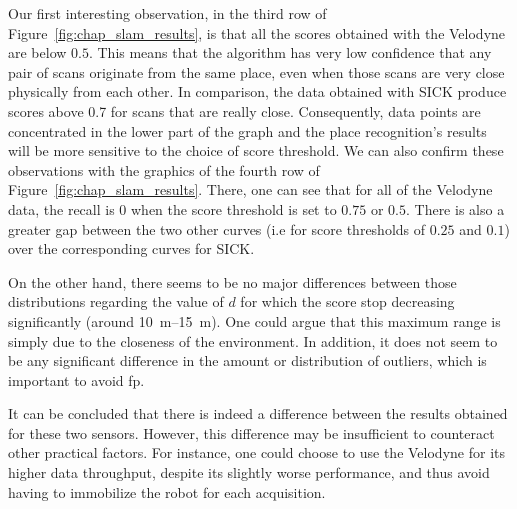 Our first interesting observation, in the third row of Figure~\ref{fig:chap_slam_results}, is that all the scores obtained with the Velodyne are below $0.5$. This means that the algorithm has very low confidence that any pair of scans originate from the same place, even when those scans are very close physically from each other. In comparison, the data obtained with SICK produce scores above 0.7 for scans that are really close. Consequently, data points are concentrated in the lower part of the graph and the place recognition’s results will be more sensitive to the choice of score threshold. We can also confirm these observations with the graphics of the fourth row of Figure~\ref{fig:chap_slam_results}. There, one can see that for all of the Velodyne data, the recall is 0 when the score threshold is set to $0.75$ or $0.5$. There is also a greater gap between the two other curves (i.e for score thresholds of $0.25$ and $0.1$) over the corresponding curves for SICK.

On the other hand, there seems to be no major differences between those distributions regarding the value of $d$ for which the score stop decreasing significantly (around \SIrange{10}{15}{\meter}). One could argue that this maximum range is simply due to the closeness of the environment. In addition, it does not seem to be any significant difference in the amount or distribution of outliers, which is important to avoid \gls*{fp}.

It can be concluded that there is indeed a difference between the results obtained for these two sensors. However, this difference may be insufficient to counteract other practical factors. For instance, one could choose to use the Velodyne for its higher data throughput, despite its slightly worse performance, and thus avoid having to immobilize the robot for each acquisition.

\FloatBarrier
